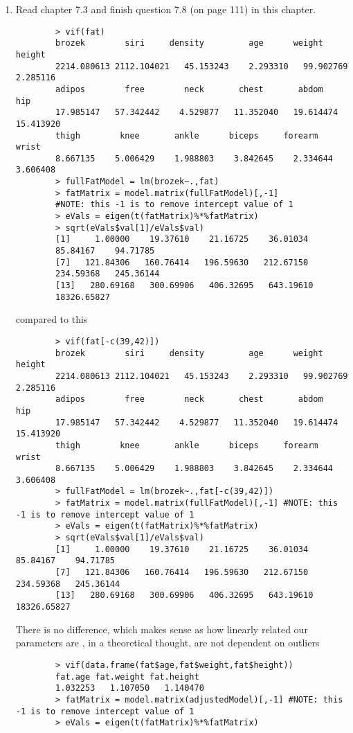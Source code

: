 \documentclass[12pt]{article}
\begin{document}
\begin{enumerate}
		\item Read chapter 7.3 and finish question 7.8 (on page 111) in this chapter.
		\begin{verbatim}
		> vif(fat)
		brozek        siri     density         age      weight      height 
		2214.080613 2112.104021   45.153243    2.293310   99.902769    2.285116 
		adipos        free        neck       chest       abdom         hip 
		17.985147   57.342442    4.529877   11.352040   19.614474   15.413920 
		thigh        knee       ankle      biceps     forearm       wrist 
		8.667135    5.006429    1.988803    3.842645    2.334644    3.606408 
		> fullFatModel = lm(brozek~.,fat)
		> fatMatrix = model.matrix(fullFatModel)[,-1] 
		#NOTE: this -1 is to remove intercept value of 1
		> eVals = eigen(t(fatMatrix)%*%fatMatrix)
		> sqrt(eVals$val[1]/eVals$val)
		[1]     1.00000    19.37610    21.16725    36.01034    
		85.84167    94.71785
		[7]   121.84306   160.76414   196.59630   212.67150   
		234.59368   245.36144
		[13]   280.69168   300.69906   406.32695   643.19610 
		18326.65827
		\end{verbatim}
		compared to this
		\begin{verbatim}
		> vif(fat[-c(39,42)])
		brozek        siri     density         age      weight      height 
		2214.080613 2112.104021   45.153243    2.293310   99.902769    2.285116 
		adipos        free        neck       chest       abdom         hip 
		17.985147   57.342442    4.529877   11.352040   19.614474   15.413920 
		thigh        knee       ankle      biceps     forearm       wrist 
		8.667135    5.006429    1.988803    3.842645    2.334644    3.606408 
		> fullFatModel = lm(brozek~.,fat[-c(39,42)])
		> fatMatrix = model.matrix(fullFatModel)[,-1] #NOTE: this -1 is to remove intercept value of 1
		> eVals = eigen(t(fatMatrix)%*%fatMatrix)
		> sqrt(eVals$val[1]/eVals$val)
		[1]     1.00000    19.37610    21.16725    36.01034    85.84167    94.71785
		[7]   121.84306   160.76414   196.59630   212.67150   234.59368   245.36144
		[13]   280.69168   300.69906   406.32695   643.19610 18326.65827
		\end{verbatim}
		There is no difference, which makes sense as how linearly related our parameters are , 
		in a theoretical thought, are not dependent on outliers
		\begin{verbatim}
		> vif(data.frame(fat$age,fat$weight,fat$height))
		fat.age fat.weight fat.height 
		1.032253   1.107050   1.140470 
		> fatMatrix = model.matrix(adjustedModel)[,-1] #NOTE: this -1 is to remove intercept value of 1
		> eVals = eigen(t(fatMatrix)%*%fatMatrix)

\end{verbatim}
\end{enumerate}
\end{document}
